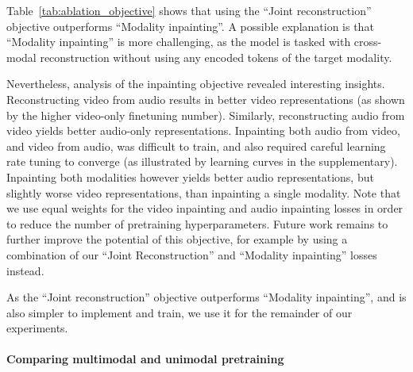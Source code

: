 \documentclass[10pt,twocolumn,letterpaper]{article}
\def \paravspace {-1\baselineskip}
\begin{document}
Table~\ref{tab:ablation_objective} shows that using the ``Joint reconstruction'' objective outperforms ``Modality inpainting''.
A possible explanation is that ``Modality inpainting'' is more challenging, as the model is tasked with cross-modal reconstruction without using any encoded tokens of the target modality.

Nevertheless, analysis of the inpainting objective revealed interesting insights.
Reconstructing video from audio results in better video representations (as shown by the higher video-only finetuning number).
Similarly, reconstructing audio from video yields better audio-only representations. 
Inpainting both audio from video, and video from audio, was difficult to train, and also required careful learning rate tuning to converge (as illustrated by learning curves in the supplementary).
Inpainting both modalities however yields better audio representations, but slightly worse video representations, than inpainting a single modality.
Note that we use equal weights for the video inpainting and audio inpainting losses in order to reduce the number of pretraining hyperparameters.
Future work remains to further improve the potential of this objective, for example by using a combination of our ``Joint Reconstruction'' and ``Modality inpainting'' losses instead.

As the ``Joint reconstruction'' objective outperforms ``Modality inpainting'', and is also simpler to implement and train, we use it for the remainder of our experiments.





\vspace{\paravspace}
\paragraph{Comparing multimodal and unimodal pretraining}



\begin{table}[t]
	\vspace{-0.25\baselineskip}
\caption{Comparison of single-modality and audiovisual pretraining on VGGSound.
	We use a ViT-Base model with 400 epochs of pretraining.
    AudioMAE and VideoMAE refer to an MAE pretrained only on audio and video respectively.
    } 
	\vspace{-0.6\baselineskip}
\centering
{}
\vspace{-0.8\baselineskip}
\label{tab:ablation_unimodal_vs_multimodal}
\end{table}
 
\end{document}
